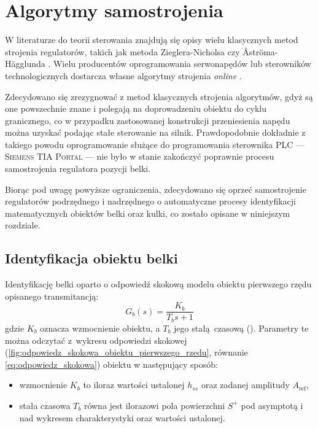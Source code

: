 \chapter{Algorytmy samostrojenia}
\label{cha:ch8_algorytmy_samostrojenia}

W literaturze do teorii sterowania znajdują się opisy wielu klasycznych metod strojenia regulatorów, takich jak metoda Zieglera-Nicholsa \cite{KOWAL}\cite{CTRLENG} czy Åströma-Hägglunda \cite{CTRLENG}\cite{ASTROMHAGGLUND}. Wielu producentów oprogramowania serwonapędów lub sterowników technologicznych dostarcza własne algorytmy strojenia \textit{online} \cite{S7MANUAL}\cite{SCL_S71200_S71500}.

Zdecydowano się zrezygnować z metod klasycznych strojenia algorytmów, gdyż są one powszechnie znane i polegają na doprowadzeniu obiektu do cyklu granicznego, co w przypadku zastosowanej konstrukcji przeniesienia napędu można uzyskać podając stałe sterowanie na silnik. Prawdopodobnie dokładnie z takiego powodu oprogramowanie służące do programowania sterownika PLC --- \textsc{Siemens TIA Portal} --- nie było w stanie zakończyć poprawnie procesu samostrojenia regulatora pozycji belki.

Biorąc pod uwagę powyższe ograniczenia, zdecydowano się oprzeć samostrojenie regulatorów podrzędnego i nadrzędnego o automatyczne procesy identyfikacji matematycznych obiektów belki oraz kulki, co zostało opisane w niniejszym rozdziale.

\section{Identyfikacja obiektu belki}
\label{sec:ch8_identyfikacja_belki}

Identyfikację belki oparto o odpowiedź skokową modelu obiektu pierwszego rzędu opisanego transmitancją:
\begin{equation}
    G_b(s) = \frac{K_b}{T_b s+1}
    \label{eq:transmitancja_obiektu_pierwszego_rzedu}
\end{equation}
gdzie $K_b$ oznacza wzmocnienie obiektu, a $T_b$ jego stałą czasową (\cite{KOWAL}). Parametry te można odczytać z~wykresu odpowiedzi skokowej (\cref{fig:odpowiedz_skokowa_obiektu_pierwszego_rzedu}, równanie \eqref{eq:odpowiedz_skokowa}) obiektu w następujący sposób:
\begin{itemize}
    \item wzmocnienie $K_b$ to iloraz wartości ustalonej $h_{ss}$ oraz zadanej amplitudy $A_\text{ref}$,
    \item stała czasowa $T_b$ równa jest ilorazowi pola powierzchni $S^+$ pod asymptotą i nad wykresem charakterystyki oraz wartości ustalonej.
\end{itemize}

